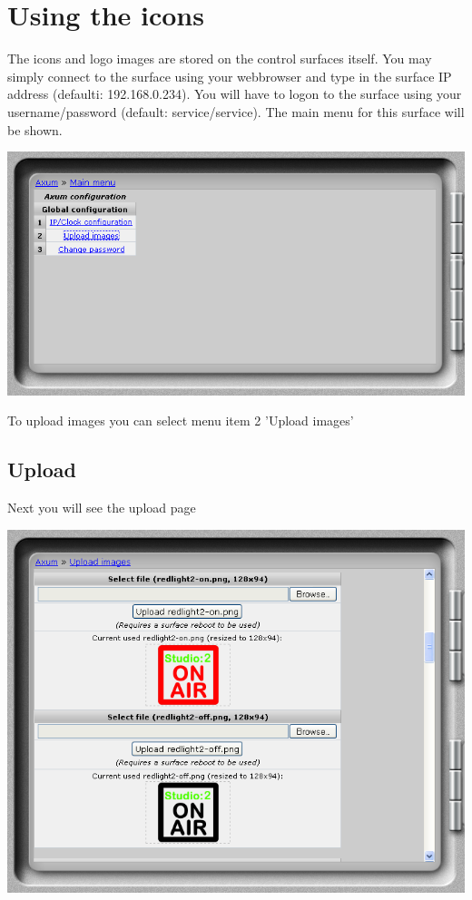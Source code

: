 \chapter{Using the icons}
The icons and logo images are stored on the control surfaces itself. You may simply connect to the surface using your webbrowser and type in the surface IP address (defaulti: 192.168.0.234). You will have to logon to the surface using your username/password (default: service/service). The main menu for this surface will be shown.

\vspace{5mm}

\includegraphics[width=13.5cm]{surfacemainmenu.png}

\vspace{5mm}

To upload images you can select menu item 2 'Upload images'

\pagebreak

\section{Upload}
Next you will see the upload page

\vspace{5mm}

\includegraphics[width=13.5cm]{uploadpage.png}

